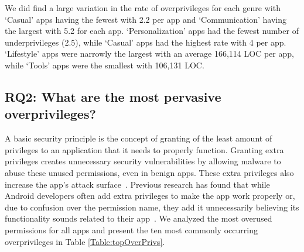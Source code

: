 \documentclass{sig-alternate}
\newcommand{\todo}[1]{\textcolor{cyan}{\textbf{[#1]}}}
\begin{document}
We did find a large variation in the rate of overprivileges for each genre with `Casual' apps having the fewest with 2.2 per app and `Communication' having the largest with 5.2 for each app. `Personalization' apps had the fewest number of underprivileges (2.5), while `Casual' apps had the highest rate with 4 per app. `Lifestyle' apps were narrowly the largest with an average 166,114 LOC per app, while `Tools' apps were the smallest with 106,131 LOC.








\subsection{RQ2: What are the most pervasive overprivileges?}

A basic security principle is the concept of granting of the least amount of privileges to an application that it needs to properly function. Granting extra privileges creates unnecessary security vulnerabilities by allowing malware to abuse these unused permissions, even in benign apps. These extra privileges also increase the app's attack surface~\cite{Davi:2010:PEA:1949317.1949356, Bartel:2012:ASP:2351676.2351722}. Previous research has found that while Android developers often add extra privileges to make the app work properly or, due to confusion over the permission name, they add it unnecessarily believing its functionality sounds related to their app~\cite{Felt:2011:APD:2046707.2046779}. We analyzed the most overused permissions for all apps and present the ten most commonly occurring overprivileges in Table \ref{Table:topOverPrivs}.
\end{document}
